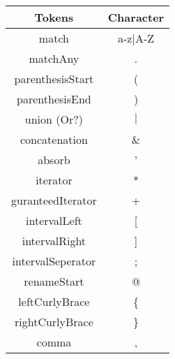 \begin{tabular}{|c|c|}
    \hline
    \textbf{Tokens} & \textbf{Character}\\
    \hline
    match & a-z$\mid$A-Z\\
    \hline
    matchAny & .\\
    \hline
    parenthesisStart & (\\
    \hline
    parenthesisEnd & )\\
    \hline
    union (Or?) & $\mid$\\
    \hline
    concatenation & \&\\
    \hline
    absorb & '\\
    \hline
    iterator & *\\
    \hline
    guranteedIterator & +\\
    \hline
    intervalLeft & [\\
    \hline
    intervalRight & ]\\
    \hline
    intervalSeperator & ;\\
    \hline
    renameStart & @\\
    \hline
    leftCurlyBrace & \{\\
    \hline
    rightCurlyBrace & \}\\
    \hline
    comma & ,\\
    \hline
\end{tabular}